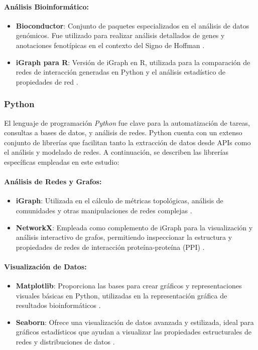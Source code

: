 \paragraph{Análisis Bioinformático:}
\begin{itemize}
	\item \textbf{Bioconductor}: Conjunto de paquetes especializados en el análisis de datos genómicos. Fue utilizado para realizar análisis detallados de genes y anotaciones fenotípicas en el contexto del Signo de Hoffman \cite{Huber2015}.
	\item \textbf{iGraph para R}: Versión de iGraph en R, utilizada para la comparación de redes de interacción generadas en Python y el análisis estadístico de propiedades de red \cite{Csardi2006}.
\end{itemize}


\subsubsection{Python}
El lenguaje de programación \textit{Python} fue clave para la automatización de tareas, consultas a bases de datos, y análisis de redes. Python cuenta con un extenso conjunto de librerías que facilitan tanto la extracción de datos desde APIs como el análisis y modelado de redes. A continuación, se describen las librerías específicas empleadas en este estudio:

\paragraph{Análisis de Redes y Grafos:}
\begin{itemize}
	\item \textbf{iGraph}: Utilizada en el cálculo de métricas topológicas, análisis de comunidades y otras manipulaciones de redes complejas \cite{igraph2006}.
	\item \textbf{NetworkX}: Empleada como complemento de iGraph para la visualización y análisis interactivo de grafos, permitiendo inspeccionar la estructura y propiedades de redes de interacción proteína-proteína (PPI) \cite{hagberg2008}.
\end{itemize}

\paragraph{Visualización de Datos:}
\begin{itemize}
	\item \textbf{Matplotlib}: Proporciona las bases para crear gráficos y representaciones visuales básicas en Python, utilizadas en la representación gráfica de resultados bioinformáticos \cite{Hunter2007}.
	\item \textbf{Seaborn}: Ofrece una visualización de datos avanzada y estilizada, ideal para gráficos estadísticos que ayudan a visualizar las propiedades estructurales de redes y distribuciones de datos \cite{Waskom2021}.
\end{itemize}


